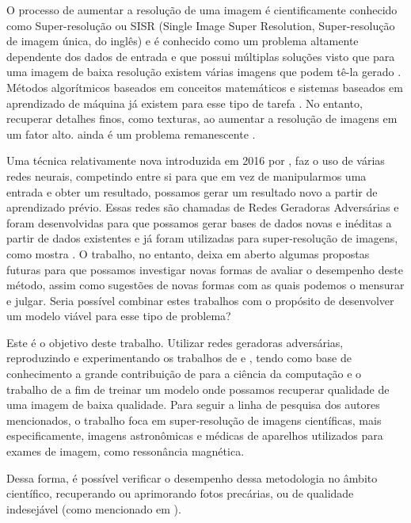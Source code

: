 O processo de aumentar a resolução de uma imagem é cientificamente conhecido como Super-resolução ou SISR (Single Image Super Resolution, Super-resolução de imagem única, do inglês) e é conhecido como um problema altamente dependente dos dados de entrada e que possui múltiplas soluções visto que para uma imagem de baixa resolução existem várias imagens que podem tê-la gerado  \cite{zhu_gan-based_2020}. Métodos algorítmicos baseados em conceitos matemáticos e sistemas baseados em aprendizado de máquina já existem para esse tipo de tarefa \cite{takemura_algoritmos_nodate, khaledyan_low-cost_2020}. No entanto, recuperar detalhes finos, como texturas, ao aumentar a resolução de imagens em um fator alto. ainda é um problema remanescente \cite{ledig_photo-realistic_2017}.

Uma técnica relativamente nova introduzida em 2016 por , faz o uso de várias redes neurais, competindo entre si para que em vez de manipularmos uma entrada e obter um resultado, possamos gerar um resultado novo a partir de aprendizado prévio. Essas redes são chamadas de Redes Geradoras Adversárias e foram desenvolvidas para que possamos gerar bases de dados novas e inéditas a partir de dados existentes \cite{goodfellow_generative_2014, moreira_geracao_2019} e já foram utilizadas para super-resolução de imagens, como mostra . O trabalho, no entanto, deixa em aberto algumas propostas futuras para que possamos investigar novas formas de avaliar o desempenho deste método, assim como sugestões de novas formas com as quais podemos o mensurar e julgar. Seria possível combinar estes trabalhos com o propósito de desenvolver um modelo viável para esse tipo de problema? 

Este é o objetivo deste trabalho. Utilizar redes geradoras adversárias, reproduzindo e experimentando os trabalhos de  e , tendo como base de conhecimento a grande contribuição de  para a ciência da computação e o trabalho de  a fim de treinar um modelo onde possamos recuperar qualidade de uma imagem de baixa qualidade. Para seguir a linha de pesquisa dos autores mencionados, o trabalho foca em super-resolução de imagens científicas, mais especificamente, imagens astronômicas e médicas de aparelhos utilizados para exames de imagem, como ressonância magnética. 

Dessa forma, é possível verificar o desempenho dessa metodologia no âmbito científico, recuperando ou aprimorando fotos precárias, ou de qualidade indesejável (como mencionado em ). 

